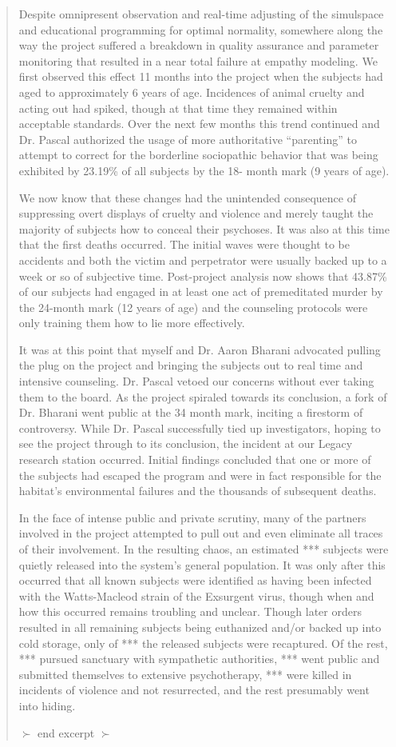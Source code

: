 \begin{quotation}
Despite omnipresent observation and real-time adjusting of the simulspace and educational programming for optimal normality, somewhere along the way the project suffered a breakdown in quality assurance and parameter monitoring that resulted in a near total failure at empathy modeling. We first observed this effect 11 months into the project when the subjects had aged to approximately 6 years of age. Incidences of animal cruelty and acting out had spiked, though at that time they remained within acceptable standards. Over the next few months this trend continued and Dr. Pascal authorized the usage of more authoritative “parenting” to attempt to correct for the borderline sociopathic behavior that was being exhibited by 23.19\% of all subjects by the 18- month mark (9 years of age). 

We now know that these changes had the unintended consequence of suppressing overt displays of cruelty and violence and merely taught the majority of subjects how to conceal their psychoses. It was also at this time that the first deaths occurred. The initial waves were thought to be accidents and both the victim and perpetrator were usually backed up to a week or so of subjective time. Post-project analysis now shows that 43.87\% of our subjects had engaged in at least one act of premeditated murder by the 24-month mark (12 years of age) and the counseling protocols were only training them how to lie more effectively. 

It was at this point that myself and Dr. Aaron Bharani advocated pulling the plug on the project and bringing the subjects out to real time and intensive counseling. Dr. Pascal vetoed our concerns without ever taking them to the board. As the project spiraled towards its conclusion, a fork of Dr. Bharani went public at the 34 month mark, inciting a firestorm of controversy. While Dr. Pascal successfully tied up investigators, hoping to see the project through to its conclusion, the incident at our Legacy research station occurred. Initial findings concluded that one or more of the subjects had escaped the program and were in fact responsible for the habitat’s environmental failures and the thousands of subsequent deaths. 

In the face of intense public and private scrutiny, many of the partners involved in the project attempted to pull out and even eliminate all traces of their involvement. In the resulting chaos, an estimated *** subjects were quietly released into the system’s general population. It was only after this occurred that all known subjects were identified as having been infected with the Watts-Macleod strain of the Exsurgent virus, though when and how this occurred remains troubling and unclear. Though later orders resulted in all remaining subjects being euthanized and/or backed up into cold storage, only of *** the released subjects were recaptured. Of the rest, *** pursued sanctuary with sympathetic authorities, *** went public and submitted themselves to extensive psychotherapy, *** were killed in incidents of violence and not resurrected, and the rest presumably went into hiding. 

$\succ$ end excerpt $\succ$ \end{quotation} 